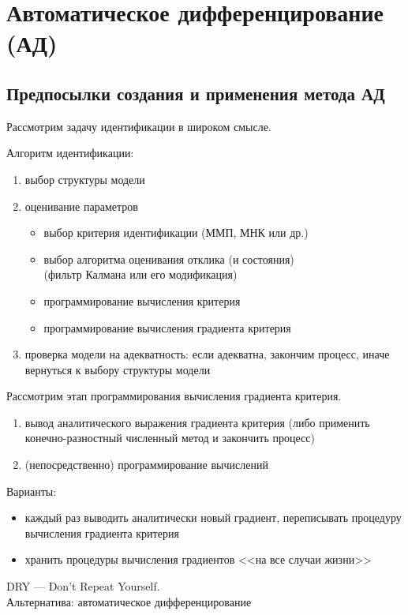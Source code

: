 \documentclass{beamer}
\begin{document}
\section{Автоматическое дифференцирование (АД)}

\subsection{Предпосылки создания и применения метода АД}

\begin{frame}{\secname}{\subsecname}
  Рассмотрим задачу идентификации в широком смысле. \\ \pause

  Алгоритм идентификации: \pause
  \begin{enumerate}
	\item выбор структуры модели \pause
	\item оценивание параметров \pause
	\begin{itemize}
	  \item выбор критерия идентификации (ММП, МНК или др.) \pause
	  \item выбор алгоритма оценивания отклика (и состояния) \pause\\(фильтр Калмана
		или его модификация) \pause
	  \item программирование вычисления критерия \pause
	  \item программирование вычисления градиента критерия \pause
	\end{itemize}
	\item проверка модели на адекватность: если адекватна, закончим процесс,
	  иначе вернуться к выбору структуры модели
  \end{enumerate}
  
\end{frame}

\begin{frame}{\secname}{\subsecname}
  Рассмотрим этап программирования вычисления градиента критерия. \pause
  \begin{enumerate}
	\item вывод аналитического выражения градиента критерия \pause (либо применить
	  конечно-разностный численный метод и закончить процесс) \pause
	\item (непосредственно) программирование вычислений
  \end{enumerate}
\end{frame}

\begin{frame}{\secname}{\subsecname}
  Варианты: \pause
  \begin{itemize}
	\item каждый раз выводить аналитически новый градиент, \pause переписывать
	процедуру вычисления градиента критерия \pause
  \item хранить процедуры вычисления градиентов <<на все случаи жизни>> \pause
  \end{itemize}
  DRY --- Don't Repeat Yourself. \\ \pause
  Альтернатива: автоматическое дифференцирование
\end{frame}
\end{document}
